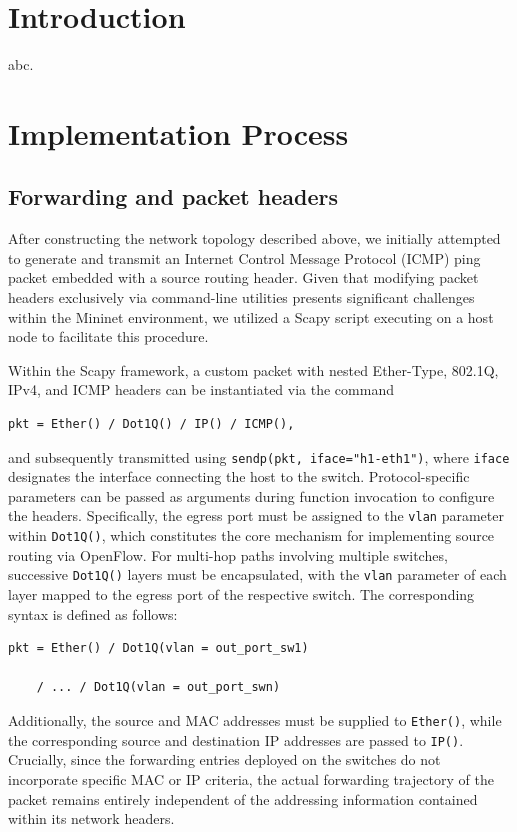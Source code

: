 \documentclass[conference]{IEEEtran}
\begin{document}
\section{Introduction}
abc.

\section{Implementation Process}

\subsection{Forwarding and packet headers}

After constructing the network topology described above, we initially attempted to generate and transmit an Internet Control Message Protocol (ICMP) ping packet embedded with a source routing header. Given that modifying packet headers exclusively via command-line utilities presents significant challenges within the Mininet environment, we utilized a Scapy script executing on a host node to facilitate this procedure.

Within the Scapy framework, a custom packet with nested Ether-Type, 802.1Q, IPv4, and ICMP headers can be instantiated via the command 
\begin{verbatim}
pkt = Ether() / Dot1Q() / IP() / ICMP(),
\end{verbatim}
and subsequently transmitted using \verb|sendp(pkt, iface="h1-eth1")|, where \verb|iface| designates the interface connecting the host to the switch. Protocol-specific parameters can be passed as arguments during function invocation to configure the headers. Specifically, the egress port must be assigned to the \verb|vlan| parameter within \verb|Dot1Q()|, which constitutes the core mechanism for implementing source routing via OpenFlow. For multi-hop paths involving multiple switches, successive \verb|Dot1Q()| layers must be encapsulated, with the \verb|vlan| parameter of each layer mapped to the egress port of the respective switch. The corresponding syntax is defined as follows:

\begin{verbatim}
pkt = Ether() / Dot1Q(vlan = out_port_sw1) 

    / ... / Dot1Q(vlan = out_port_swn)
\end{verbatim}

Additionally, the source and MAC addresses must be supplied to \verb|Ether()|, while the corresponding source and destination IP addresses are passed to \verb|IP()|. Crucially, since the forwarding entries deployed on the switches do not incorporate specific MAC or IP criteria, the actual forwarding trajectory of the packet remains entirely independent of the addressing information contained within its network headers.
\end{document}
